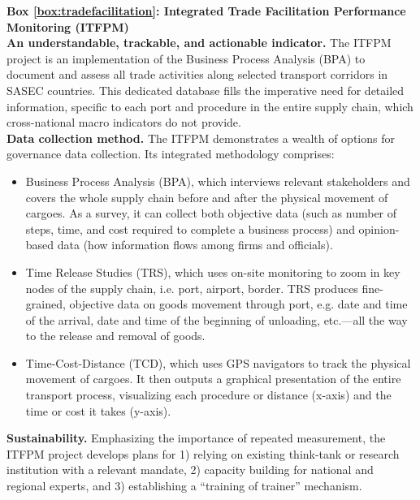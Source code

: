 \documentclass[12pt]{article}
\begin{document}
\begin{textbox}
  \textbf{Box \ref{box:tradefacilitation}: Integrated Trade Facilitation Performance Monitoring (ITFPM)}\\

  \textbf{An understandable, trackable, and actionable indicator.} The ITFPM project is an implementation of the Business Process Analysis (BPA) to document and assess all trade activities along selected transport corridors in SASEC countries. This dedicated database fills the imperative need for detailed information, specific to each port and procedure in the entire supply chain, which cross-national macro indicators do not provide.\\

  \textbf{Data collection method.} The ITFPM demonstrates a wealth of options for governance data collection. Its integrated methodology comprises:
  \begin{itemize}[noitemsep]
    \item{Business Process Analysis (BPA), which interviews relevant stakeholders and covers the whole supply chain before and after the physical movement of cargoes. As a survey, it can collect both objective data (such as number of steps, time, and cost required to complete a business process) and opinion-based data (how information flows among firms and officials).}
     \item{Time Release Studies (TRS), which uses on-site monitoring to zoom in key nodes of the supply chain, i.e. port, airport, border. TRS produces fine-grained, objective data on goods movement through port, e.g. date and time of the arrival, date and time of the beginning of unloading, etc.---all the way to the release and removal of goods.}
     \item{Time-Cost-Distance (TCD), which uses GPS navigators to track the physical movement of cargoes. It then outputs a graphical presentation of the entire transport process, visualizing each procedure or distance (x-axis) and the time or cost it takes (y-axis).}
  \end{itemize}

  \textbf{Sustainability.} Emphasizing the importance of repeated measurement, the ITFPM project develops plans for 1) relying on existing think-tank or research institution with a relevant mandate, 2) capacity building for national and regional experts, and 3) establishing a ``training of trainer'' mechanism.\\


\end{textbox}
\end{document}
